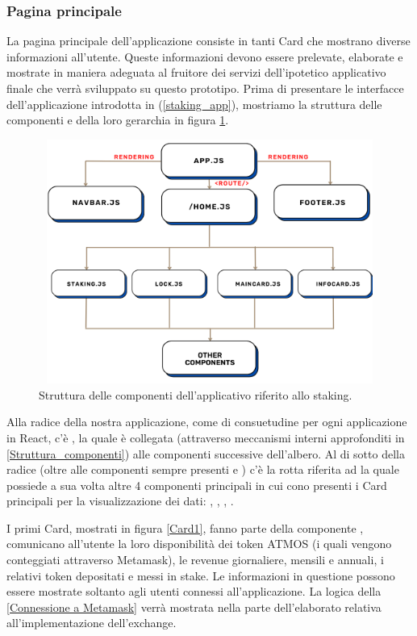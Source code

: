 \subsubsection{Pagina principale}
La pagina principale dell'applicazione consiste in tanti Card che mostrano diverse informazioni all'utente. Queste informazioni devono essere prelevate, elaborate e mostrate in maniera adeguata al fruitore dei servizi dell'ipotetico applicativo finale che verrà sviluppato su questo prototipo.
Prima di presentare le interfacce dell'applicazione introdotta in (\ref{staking_app}), mostriamo la struttura delle componenti e della loro gerarchia in figura \ref{struttura_staking}.
\begin{figure}[h]
    \centering
    \includegraphics[width=14cm,height=8cm]{Immagini/StakingChart.png}
    \caption[Albero delle componenti dell'applicativo riferito allo staking]{Struttura delle componenti dell'applicativo riferito allo staking.}
    \label{struttura_staking}
\end{figure}
Alla radice della nostra applicazione, come di consuetudine per ogni applicazione in React, c'è , la quale è collegata (attraverso meccanismi interni approfonditi in \ref{Struttura_componenti}) alle componenti successive dell'albero. Al di sotto della radice (oltre alle componenti sempre presenti  e ) c'è la rotta riferita ad  la quale possiede a sua volta altre 4 componenti principali in cui cono presenti i Card principali per la visualizzazione dei dati: , , , .


I primi Card, mostrati in figura \ref{Card1}, fanno parte della componente , comunicano all'utente la loro disponibilità dei token ATMOS (i quali vengono conteggiati attraverso Metamask), le revenue giornaliere, mensili e annuali, i relativi token depositati e messi in stake.
Le informazioni in questione possono essere mostrate soltanto agli utenti connessi all'applicazione. La logica della \ref{Connessione a Metamask} verrà mostrata nella parte dell'elaborato relativa all'implementazione dell'exchange. 

